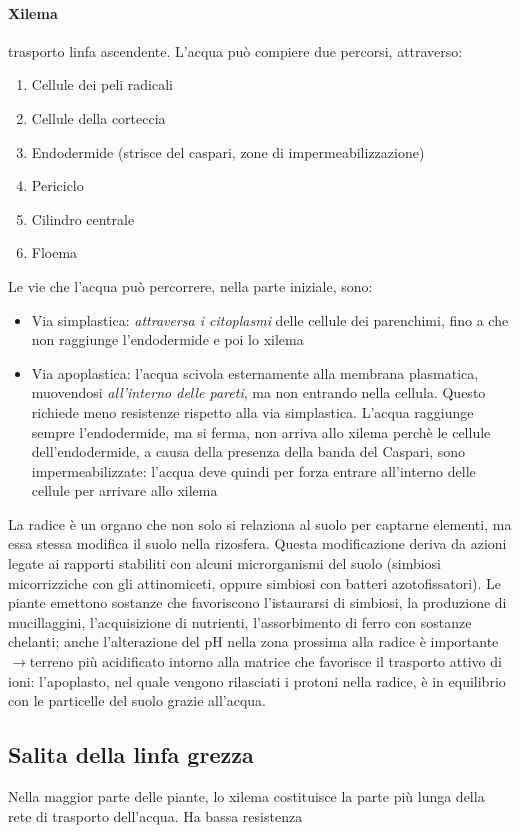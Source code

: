 \documentclass[a4paper,12pt]{book}
\newcommand{\lfreccia}{\ensuremath{\longrightarrow}}
\begin{document}
\paragraph{Xilema} trasporto linfa ascendente.
L'acqua può compiere due percorsi, attraverso:
\begin{enumerate}
\item{Cellule dei peli radicali}
\item{Cellule della corteccia}
\item{Endodermide (strisce del caspari, zone di impermeabilizzazione)}
\item{Periciclo}
\item{Cilindro centrale}
\item{Floema}
\end{enumerate}

Le vie che l'acqua può percorrere, nella parte iniziale, sono:
\begin{itemize}
\item{Via simplastica: \emph{attraversa i citoplasmi} delle cellule dei parenchimi, fino a che non raggiunge l'endodermide e poi lo xilema}
\item{Via apoplastica: l'acqua scivola esternamente alla membrana plasmatica, muovendosi \emph{all'interno delle pareti}, ma non entrando nella cellula. Questo richiede meno resistenze rispetto alla via simplastica. L'acqua raggiunge sempre l'endodermide, ma si ferma, non arriva allo xilema perchè le cellule dell'endodermide, a causa della presenza della banda del Caspari, sono impermeabilizzate: l'acqua deve  quindi per forza entrare all'interno delle cellule per arrivare allo xilema}
\end{itemize} 
La radice è un organo che non solo si relaziona al suolo per captarne elementi, ma essa stessa modifica il suolo nella rizosfera. Questa modificazione deriva da azioni legate ai rapporti stabiliti con alcuni microrganismi del suolo (simbiosi micorrizziche con gli attinomiceti, oppure simbiosi con batteri azotofissatori). Le piante emettono sostanze che favoriscono l'istaurarsi di simbiosi, la produzione di mucillaggini, l'acquisizione di nutrienti, l'assorbimento di ferro con sostanze chelanti; anche l'alterazione del pH nella zona prossima alla radice è importante \lfreccia terreno più acidificato intorno alla matrice che favorisce il trasporto attivo di ioni: l'apoplasto, nel quale vengono rilasciati i protoni nella radice, è in equilibrio con le particelle del suolo grazie all'acqua.

\subsection{Salita della linfa grezza}
Nella maggior parte delle piante, lo xilema costituisce la parte più lunga della rete di trasporto dell'acqua. Ha bassa resistenza
\end{document}
